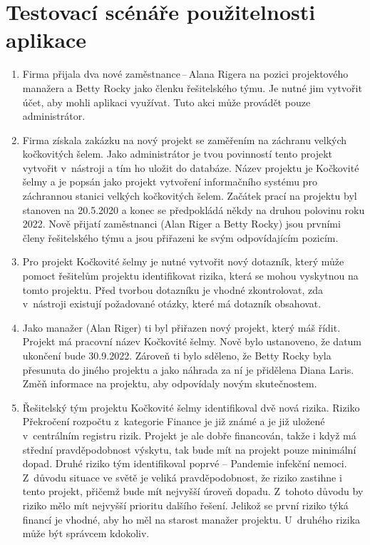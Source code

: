 \chapter{Testovací scénáře použitelnosti aplikace}
\label{testPodrobnosti}
\begin{enumerate}
    \item Firma přijala dva nové zaměstnance\,--\,Alana Rigera na pozici projektového manažera a Betty Rocky jako členku řešitelského týmu. Je nutné jim vytvořit účet, aby mohli aplikaci využívat. Tuto akci může provádět pouze administrátor.
    \item Firma získala zakázku na nový projekt se zaměřením na záchranu velkých kočkovitých šelem. Jako administrátor je tvou povinností tento projekt vytvořit v~nástroji a tím ho uložit do databáze. Název projektu je Kočkovité šelmy a je popsán jako projekt vytvoření informačního systému pro záchrannou stanici velkých kočkovitých šelem. Začátek prací na projektu byl stanoven na 20.5.2020 a konec se předpokládá někdy na druhou polovinu roku 2022. Nově přijatí zaměstnanci (Alan Riger a Betty Rocky) jsou prvními členy řešitelského týmu a jsou přiřazeni ke svým odpovídajícím pozicím.
    \item Pro projekt Kočkovité šelmy je nutné vytvořit nový dotazník, který může pomoct řešitelům projektu identifikovat rizika, která se mohou vyskytnou na tomto projektu. Před tvorbou dotazníku je vhodné zkontrolovat, zda v~nástroji existují požadované otázky, které má dotazník obsahovat.
    \item Jako manažer (Alan Riger) ti byl přiřazen nový projekt, který máš řídit. Projekt má pracovní název Kočkovité šelmy. Nově bylo ustanoveno, že datum ukončení bude 30.9.2022. Zároveň ti bylo sděleno, že Betty Rocky byla přesunuta do jiného projektu a jako náhrada za ní je přidělena Diana Laris. Změň informace na projektu, aby odpovídaly novým skutečnostem.
    \item Řešitelský tým projektu Kočkovité šelmy identifikoval dvě nová rizika. Riziko Překročení rozpočtu z~kategorie Finance je již známé a je již uložené v~centrálním registru rizik. Projekt je ale dobře financován, takže i když má střední pravděpodobnost výskytu, tak bude mít na projekt pouze minimální dopad. Druhé riziko tým identifikoval poprvé – Pandemie infekční nemoci. Z~důvodu situace ve světě je veliká pravděpodobnost, že riziko zastihne i tento projekt, přičemž bude mít nejvyšší úroveň dopadu. Z~tohoto důvodu by riziko mělo mít nejvyšší prioritu dalšího řešení. Jelikož se první riziko týká financí je vhodné, aby ho měl na starost manažer projektu. U~druhého rizika může být správcem kdokoliv.

\end{enumerate}
